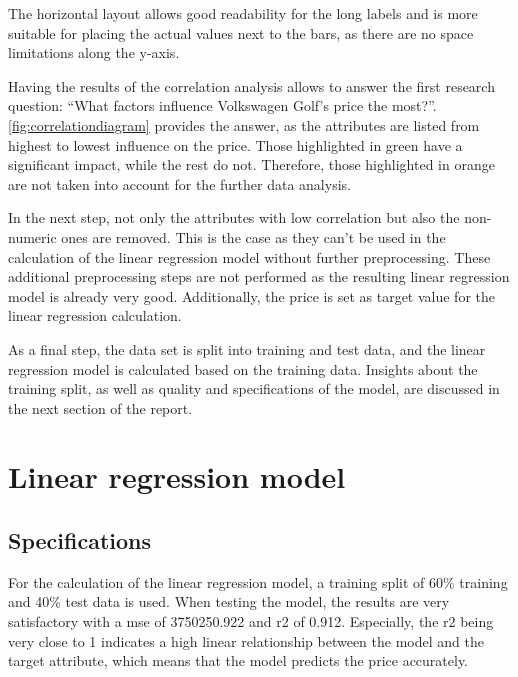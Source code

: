 The horizontal layout allows good readability for the long labels and is more suitable for placing the actual values next to the
bars, as there are no space limitations along the y-axis. 
\par
Having the results of the correlation analysis allows to answer the first research question: \enquote{What factors influence Volkswagen Golf's price the most?}.
\autoref{fig:correlationdiagram} provides the answer, as the attributes are listed from highest to lowest influence on the price. Those highlighted in green
have a significant impact, while the rest do not. Therefore, those highlighted in orange are not taken into account for the further data analysis.

\par
In the next step, not only the attributes with low correlation but also the non-numeric ones are removed. This is the case as they can't be used in the calculation
of the linear regression model without further preprocessing. These additional preprocessing steps are not performed as the resulting linear regression
model is already very good. 
Additionally, the price is set as target value for the linear regression calculation.

\par
As a final step, the data set is split into training and test data, and the linear regression model is calculated based on the
training data. Insights about the training split, as well as quality and specifications of the model, are discussed in the next section of the report. 

\section{Linear regression model}
\subsection{Specifications}
For the calculation of the linear regression model, a training split of 60\% training and 40\% test data is used.
When testing the model, the results are very satisfactory with a \ac{mse} of 3750250.922 and \ac{r2} of 0.912.
Especially, the \ac{r2} being very close to 1 indicates a high linear relationship between the model and the target attribute,
which means that the model predicts the price accurately.

